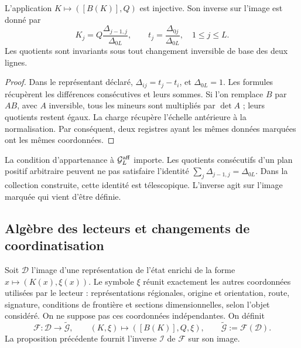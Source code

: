 \begin{proposition}
\label{prop:compat-inversa-marcada}
L'application \(K\mapsto([B(K)],Q)\) est injective. Son inverse sur l'image est donné par
\begin{equation}
 K_j=Q\frac{\Delta_{j-1,j}}{\Delta_{0L}},
 \qquad
 t_j=\frac{\Delta_{0j}}{\Delta_{0L}},
 \quad 1\leq j\leq L.
 \label{eq:compat-inversa-plucker}
\end{equation}
Les quotients sont invariants sous tout changement inversible de base
des deux lignes.
\end{proposition}
\begin{proof}
Dans le représentant déclaré, \(\Delta_{ij}=t_j-t_i\), et \(\Delta_{0L}=1\). Les formules récupèrent les différences consécutives et leurs sommes. Si l'on remplace \(B\) par \(AB\), avec \(A\) inversible, tous les mineurs sont multipliés par \(\det A\) ; leurs quotients restent égaux. La charge récupère l'échelle antérieure à la normalisation. Par conséquent, deux registres ayant les mêmes données marquées ont les mêmes coordonnées.
\end{proof}

La condition d'appartenance à \(\mathcal G_L^{\rm aff}\) importe. Les quotients consécutifs d'un plan positif arbitraire peuvent ne pas satisfaire l'identité \(\sum_j\Delta_{j-1,j}=\Delta_{0L}\). Dans la collection construite, cette identité est télescopique. L'inverse agit sur l'image marquée qui vient d'être définie.

\subsection{Algèbre des lecteurs et changements de coordinatisation}

Soit \(\mathcal D\) l'image d'une représentation de l'état enrichi de la forme \(x\mapsto(K(x),\xi(x))\). Le symbole \(\xi\) réunit exactement les autres coordonnées utilisées par le lecteur : représentations régionales, origine et orientation, route, signature, conditions de frontière et sections dimensionnelles, selon l'objet considéré. On ne suppose pas ces coordonnées indépendantes. On définit
\[
 \mathcal F:\mathcal D\longrightarrow\widetilde{\mathcal G},
 \qquad (K,\xi)\longmapsto([B(K)],Q,\xi),
 \qquad \widetilde{\mathcal G}:=\mathcal F(\mathcal D).
\]
La proposition précédente fournit l’inverse \(\mathcal I\) de
\(\mathcal F\) sur son image.

